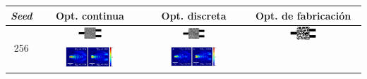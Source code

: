 \begin{landscape}
\begin{table}[ht]
    \centering
    \vspace*{-2.5cm}
    \hspace*{-5cm}
    \begin{tabular}{|c|c|c|c|}
    \hline 
    \emph{Seed} & Opt. continua & Opt. discreta &  Opt. de fabricación \\
    \hline
      \multirow{2}{*}{256} &
      \includegraphics[width=0.24\textwidth]{image/results/wdm/MMA/visualize_eps_cont_256.png} &
      \includegraphics[width=0.24\textwidth]{image/results/wdm/MMA/visualize_eps_disc_256.png} &
      \includegraphics[width=0.24\textwidth]{image/results/wdm/MMA/visualize_eps_fab_256.png} \\
      \cline{2-4}
      &
      \includegraphics[width=0.50\textwidth]{image/results/wdm/MMA/visualize_field_cont_256.png} &
      \includegraphics[width=0.50\textwidth]{image/results/wdm/MMA/visualize_field_disc_256.png} &

\end{tabular}
\end{table}
\end{landscape}
